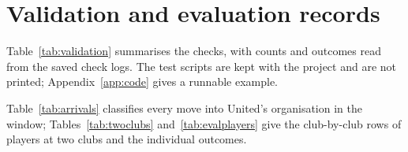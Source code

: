 \section{Validation and evaluation records}\label{app:validation}

Table~\ref{tab:validation} summarises the checks, with counts and outcomes read from the saved check logs. The test scripts are kept with the project and are not printed; Appendix~\ref{app:code} gives a runnable example.

\begin{apptable}
\label{tab:validation}
\end{apptable}

Table~\ref{tab:arrivals} classifies every move into United's organisation in the window; Tables~\ref{tab:twoclubs} and~\ref{tab:evalplayers} give the club-by-club rows of players at two clubs and the individual outcomes.

\begin{apptable}
\label{tab:arrivals}
\end{apptable}

\begin{apptable}
\label{tab:twoclubs}
\end{apptable}

\FloatBarrier
{}


\FloatBarrier

